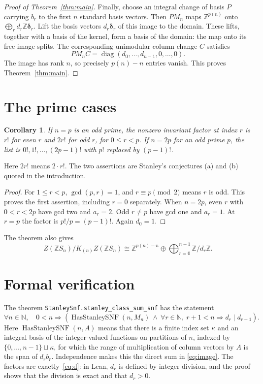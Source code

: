 \documentclass[11pt]{article}
\newtheorem{corollary}[theorem]{Corollary}
\theoremstyle{remark}
\newcommand{\Z}{\mathbb{Z}}
\newcommand{\diag}{\operatorname{diag}}
\begin{document}
\begin{proof}[Proof of Theorem~\ref{thm:main}]
Finally, choose an integral change of basis $P$ carrying $b_r$ to
the first $n$ standard basis vectors. Then $PM_n$ maps
$\Z^{p(n)}$ onto $\bigoplus_r d_r\Z\boldsymbol\delta_r$. Lift the basis
vectors $d_r\boldsymbol\delta_r$ of this image to the domain. These lifts,
together with a basis of the kernel, form a basis of the domain:
the map onto its free image splits. The corresponding unimodular
column change $C$ satisfies
\[
 PM_nC=\diag(d_0,\ldots,d_{n-1},0,\ldots,0).
\]
The image has rank $n$, so precisely $p(n)-n$ entries vanish.
This proves Theorem~\ref{thm:main}.
\end{proof}

\section{The prime cases}
\begin{corollary}\label{cor:primes}
If $n=p$ is an odd prime, the nonzero invariant factor at index $r$
is $r!$ for even $r$ and $2r!$ for odd $r$, for $0\leq r<p$.
If $n=2p$ for an odd prime $p$, the list is $0!,1!,\ldots,(2p-1)!$
with $p!$ replaced by $(p-1)!$.
\end{corollary}
Here $2r!$ means $2\cdot r!$. The two assertions are Stanley's
conjectures (a) and (b) quoted in the introduction.
\begin{proof}
For $1\leq r<p$, $\gcd(p,r)=1$, and $r\equiv p\pmod2$
means $r$ is odd. This proves the first assertion, including $r=0$
separately. When $n=2p$, even $r$ with $0<r<2p$ have gcd two
and $a_r=2$. Odd $r\ne p$ have gcd one and $a_r=1$. At $r=p$
the factor is $p!/p=(p-1)!$. Again $d_0=1$.
\end{proof}

The theorem also gives
\[
 Z(\Z S_n)/K_{(n)}Z(\Z S_n)
 \cong\Z^{p(n)-n}\oplus\bigoplus_{r=0}^{n-1}\Z/d_r\Z.
\]

\section{Formal verification}\label{sec:lean}
The theorem \texttt{StanleySnf.stanley\_class\_sum\_snf} has the statement
\[
 \forall n\in\mathbb N,\quad 0<n\Longrightarrow
 \left(\operatorname{HasStanleySNF}(n,M_n)\ \land\
 \forall r\in\mathbb N,\ r+1<n\Longrightarrow d_r\mid d_{r+1}\right).
\]
Here $\operatorname{HasStanleySNF}(n,A)$ means that there is a finite
index set $\kappa$ and an integral basis of the integer-valued functions
on partitions of $n$, indexed by $\{0,\ldots,n-1\}\sqcup\kappa$,
for which the range of multiplication of column vectors by $A$ is the
span of $d_r b_r$. Independence makes this the direct sum in
\eqref{eq:image}. The factors are exactly~\eqref{eq:d}: in Lean, $d_r$ is
defined by integer division, and the proof shows that the division is
exact and that $d_r>0$.
\end{document}
